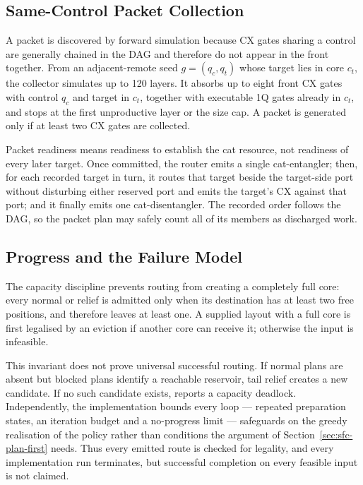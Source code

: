 \subsection{Same-Control Packet Collection}
\label{sec:sfc-packet}

A packet is discovered by forward simulation because CX gates sharing a
control are generally chained in the DAG and therefore do not appear in the
front together.  From an adjacent-remote seed $g=(q_c,q_t)$ whose target lies
in core $c_t$, the collector simulates up to 120 layers.  It absorbs up to eight
front CX gates with control $q_c$ and target in $c_t$, together with executable
1Q gates already in $c_t$, and stops at the first unproductive layer or the
size cap.  A packet is generated only if at least two CX gates are collected.

Packet readiness means readiness to establish the cat resource, not readiness
of every later target.  Once committed, the router emits a single
cat-entangler; then, for each recorded target in turn, it routes that target
beside the target-side port without disturbing either reserved port and emits
the target's CX against that port; and it finally emits one
cat-disentangler.  The recorded order follows the DAG, so the packet plan may
safely count all of its members as discharged work.

\subsection{Progress and the Failure Model}
\label{sec:sfc-progress}

The capacity discipline prevents routing from creating a completely full core:
every normal or relief \TeleData{} is admitted only when its destination has
at least two free positions, and therefore leaves at least one.  A supplied
layout with a full core is first legalised by an eviction if another core can
receive it; otherwise the input is infeasible.

This invariant does not prove universal successful routing.  If normal plans
are absent but blocked plans identify a reachable reservoir, tail relief creates
a new candidate.  If no such candidate exists, \PORTER{} reports a capacity
deadlock. Independently, the implementation bounds every loop --- repeated
preparation states, an iteration budget and a no-progress limit --- safeguards
on the greedy realisation of the policy rather than conditions the argument of
Section~\ref{sec:sfc-plan-first} needs.  Thus every emitted route is checked
for legality, and every implementation run terminates, but successful
completion on every feasible input is not claimed.
